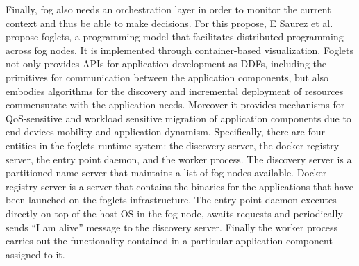 \noindent\tab Finally, fog also needs an orchestration layer in order to monitor the current context and thus be able to make decisions. For this propose, E Saurez et al. \cite{saurez2016incremental} propose foglets, a programming model that facilitates distributed programming across fog nodes. It is implemented through container-based visualization. Foglets not only provides APIs for application development as DDFs, including the primitives for communication between the application components, but also embodies algorithms for the discovery and incremental deployment of resources commensurate with the application needs. Moreover it provides mechanisms for QoS-sensitive and workload sensitive migration of application components due to end devices mobility and application dynamism. Specifically, there are four entities in the foglets runtime system: the discovery server, the docker registry server, the entry point daemon, and the worker process. The discovery server is a partitioned name server that maintains a list of fog nodes available. Docker registry server is a server that contains the binaries for the applications that have been launched on the foglets infrastructure. The entry point daemon executes directly on top of the host OS in the fog node, awaits requests and periodically sends ``I am alive'' message to the discovery server. Finally the worker process carries out the functionality contained in a particular application component assigned to it.\\
